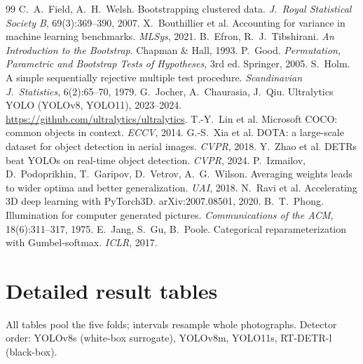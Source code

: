 \documentclass[11pt,a4paper]{article}
\begin{document}
\begin{thebibliography}{99}
 C.~A.~Field, A.~H.~Welsh. Bootstrapping clustered data. \emph{J.\ Royal Statistical Society B}, 69(3):369--390, 2007.
 X.~Bouthillier et al. Accounting for variance in machine learning benchmarks. \emph{MLSys}, 2021.
 B.~Efron, R.~J.~Tibshirani. \emph{An Introduction to the Bootstrap}. Chapman \& Hall, 1993.
 P.~Good. \emph{Permutation, Parametric and Bootstrap Tests of Hypotheses}, 3rd ed. Springer, 2005.
 S.~Holm. A simple sequentially rejective multiple test procedure. \emph{Scandinavian J.\ Statistics}, 6(2):65--70, 1979.
 G.~Jocher, A.~Chaurasia, J.~Qiu. Ultralytics YOLO (YOLOv8, YOLO11), 2023--2024. \url{https://github.com/ultralytics/ultralytics}.
 T.-Y.~Lin et al. Microsoft COCO: common objects in context. \emph{ECCV}, 2014.
 G.-S.~Xia et al. DOTA: a large-scale dataset for object detection in aerial images. \emph{CVPR}, 2018.
 Y.~Zhao et al. DETRs beat YOLOs on real-time object detection. \emph{CVPR}, 2024.
 P.~Izmailov, D.~Podoprikhin, T.~Garipov, D.~Vetrov, A.~G.~Wilson. Averaging weights leads to wider optima and better generalization. \emph{UAI}, 2018.
 N.~Ravi et al. Accelerating 3D deep learning with PyTorch3D. arXiv:2007.08501, 2020.
 B.~T.~Phong. Illumination for computer generated pictures. \emph{Communications of the ACM}, 18(6):311--317, 1975.
 E.~Jang, S.~Gu, B.~Poole. Categorical reparameterization with Gumbel-softmax. \emph{ICLR}, 2017.
\end{thebibliography}

\clearpage
\appendix
\section{Detailed result tables}\label{app:tables}
All tables pool the five folds; intervals resample whole photographs. Detector order: YOLOv8s (white-box surrogate), YOLOv8m, YOLO11s, RT-DETR-l (black-box).


\end{document}
